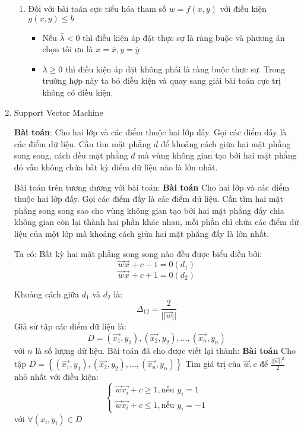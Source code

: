 \documentclass{article}
\begin{document}
\begin{enumerate}
\begin{enumerate}
            \item Đối với bài toán cực tiểu hóa tham số $w = f(x, y)$ với điều kiện $g(x,y) \leq b$ 
            \begin{itemize}
                \item Nếu $\bar{\lambda} < 0$ thì điều kiện áp đặt thực sự là ràng 
                buộc và phương án chọn tối ưu là $x=\bar{x}, y = \bar{y}$
                \item $\bar{\lambda} \geq 0$ thì điều kiện áp đặt không phải là ràng 
                buộc thực sự. Trong trường hợp này ta bỏ điều kiện và quay sang giải bài toán 
                cực trị không có điều kiện.
            \end{itemize}

        \end{enumerate}
        
        
        \item Support Vector Machine
        
        
         
        \textbf{Bài toán}: Cho hai lớp và các điểm thuộc hai lớp đấy. 
        Gọi các điểm đấy là các điểm dữ liệu.
        Cần tìm mặt phẳng $d$ để khoảng cách giữa hai mặt 
        phẳng song song, cách đều mặt phẳng $d$ mà vùng
        không gian tạo bởi hai mặt phẳng đó vẫn không 
        chứa bất kỳ điểm dữ liệu nào là lớn nhất.

        Bài toán trên tương đương với bài toán: \newline
        \textbf{Bài toán} Cho hai lớp và các điểm thuộc hai lớp đấy. Gọi các điểm đấy là các điểm dữ liệu.
        Cần tìm hai mặt phẳng song song sao cho vùng không gian tạo bởi hai mặt 
        phẳng đấy chia không gian còn lại thành hai phần khác nhau, mỗi phần chỉ chứa 
        các điểm dữ liệu của một lớp mà khoảng cách giữa hai mặt phẳng đấy là lớn nhất.

        Ta có:
        Bất kỳ hai mặt phẳng song song nào đều được biểu diễn bởi:
        $$\vec{w}\vec{x} + c - 1 = 0 (d_1)$$
        $$\vec{w}\vec{x} + c + 1 = 0 (d_2)$$

        Khoảng cách giữa $d_1$ và $d_2$ là:
        $$\Delta _{12} = \frac{2}{||\vec{w}||}$$
        Giả sử tập các điểm dữ liệu là:
        $$D =  {(\vec{x_1},y_1), (\vec{x_2}, y_2), \dots, (\vec{x_n}, y_n)}$$
        với $n$ là số lượng dữ liệu.\newline
        Bài toán đã cho được viết lại thành:\newline
        \textbf{Bài toán} Cho tập $D =\left \{ (\vec{x_1},y_1), (\vec{x_2}, y_2), \dots, (\vec{x_n}, y_n) \right \}  $ \newline 
        Tìm giá trị của $\vec{w}, c$ để $\frac{||\vec{w}||^{2}}{2}$ nhỏ nhất với điều kiện:
        $$
        \left\{\begin{matrix}
            \vec{w}\vec{x_i} + c \geq 1, \text{nếu } y_i = 1 \\
            \vec{w}\vec{x_i} + c \leq 1, \text{nếu } y_i = -1
        \end{matrix}\right.$$
        với $\forall (x_i, y_i) \in D$


\end{enumerate}
\end{document}
